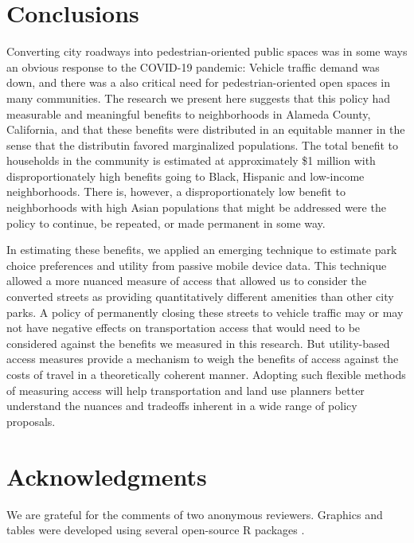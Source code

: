 \documentclass[3p, authoryear, review]{elsarticle} %
\begin{document}
\hypertarget{conclusions}{%
\section{Conclusions}\label{conclusions}}

Converting city roadways into pedestrian-oriented public spaces was in some ways
an obvious response to the COVID-19 pandemic: Vehicle traffic demand was down,
and there was a also critical need for pedestrian-oriented open spaces in many
communities. The research we present here suggests that this policy had
measurable and meaningful benefits to neighborhoods in Alameda County,
California, and that these benefits were distributed in an equitable manner in the sense that the distributin favored marginalized populations. The total benefit to households in the community is estimated
at approximately \$1 million with disproportionately high benefits going to
Black, Hispanic and low-income neighborhoods. There is, however, a
disproportionately low benefit to neighborhoods with high Asian populations that
might be addressed were the policy to continue, be repeated, or made permanent
in some way.

In estimating these benefits, we applied an emerging technique to estimate park
choice preferences and utility from passive mobile device data. This technique
allowed a more nuanced measure of access that allowed us to consider the
converted streets as providing quantitatively different amenities than other city
parks. A policy of permanently closing these streets to vehicle traffic may or
may not have negative effects on transportation access that would need to be
considered against the benefits we measured in this research. But utility-based
access measures provide a mechanism to weigh the benefits of access against the
costs of travel in a theoretically coherent manner. Adopting such flexible
methods of measuring access will help transportation and land use planners
better understand the nuances and tradeoffs inherent in a wide range of policy
proposals.

\hypertarget{acknowledgments}{%
\section*{Acknowledgments}\label{acknowledgments}}

We are grateful for the comments of two anonymous reviewers. Graphics and tables
were developed using several open-source R packages \citep{ggspatial, modelsummary, wesanderson}.


\end{document}
